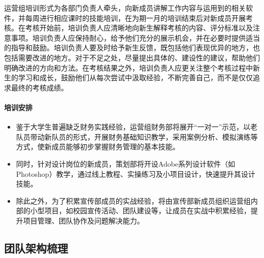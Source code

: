                 运营组培训形式为各部门负责人牵头，向新成员讲解工作内容与运用到的相关软件，并每周进行相应课时的技能培训，在为期一月的培训结束后对新成员开展考核。在考核开始前，培训负责人应清晰地向新生解释考核的内容、评分标准以及注意事项。培训负责人应保持耐心，给予他们充分的展示机会，并在必要时提供适当的指导和鼓励。培训负责人要及时给予新生反馈，既包括他们表现优异的地方，也包括需要改进的地方。对于不足之处，尽量提出具体的、建设性的建议，帮助他们明确改进的方向和方法。在考核结果之外，培训负责人应更关注整个考核过程中新生的学习和成长，鼓励他们从每次尝试中汲取经验，不断完善自己，而不是仅仅追求最终的考核成绩。

            \paragraph{培训安排}



                \begin{itemize}
                    \item 鉴于大学生普遍缺乏财务实践经验，运营组财务部将展开“一对一”示范，以老队员带动新队员的形式，开展财务基础知识教学，采用案例分析、模拟演练等方式，使新成员能够初步掌握财务管理的基本技能。
                    \item 同时，针对设计岗位的新成员，策划部将开设Adobe系列设计软件（如Photoshop）教学，通过线上教程、实操练习及小项目设计，快速提升其设计技能。
                    \item 除此之外，为了积累宣传部成员的实战经验，将由宣传部新成员组织运营组内部的小型项目，如校园宣传活动、团队建设等，让成员在实战中积累经验，提升项目管理、团队协作及问题解决能力。
                \end{itemize}

    \subsection{团队架构梳理}
    